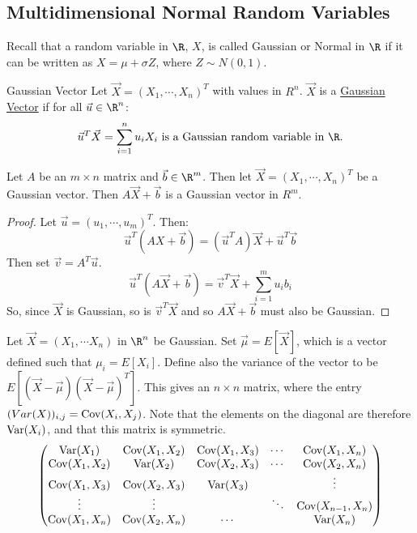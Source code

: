 \documentclass[../Main.tex]{subfiles}
\begin{document}
\subsection{Multidimensional Normal Random Variables}
Recall that a random variable in $\R$, $X$, is called Gaussian or Normal in $\R$ if it can be written as $X = \mu + \sigma Z$, where $Z \sim N(0, 1)$.
\begin{definition}{Gaussian Vector}
    Let $\vec{X} = (X_1, \cdots, X_n)^T$ with values in $R^n$. $\vec{X}$ is a \underline{Gaussian Vector} if for all $\vec{u} \in \R^n$:
    \begin{equation*}
        \vec{u}^T \vec{X} = \sum_{i=1}^n u_i X_i \text{ is a Gaussian random variable in } \R.
    \end{equation*}
\end{definition}
\begin{proposition}
    Let $A$ be an $m \times n$ matrix and $\vec{b} \in \R^m$. Then let $\vec{X} = (X_1, \cdots, X_n)^T$ be a Gaussian vector. Then $A\vec{X} + \vec{b}$ is a Gaussian vector in $R^m$.
    \label{propGaussVecLinearMap}
\end{proposition}
\begin{proof}
    Let $\vec{u} = (u_1, \cdots, u_m)^T$. Then:
    \begin{equation*}
        \vec{u}^T (AX + \vec{b}) = (\vec{u}^T A)\vec{X} + \vec{u}^T \vec{b}
    \end{equation*}
    Then set $\vec{v} = A^T \vec{u}$.
    \begin{equation*}
        \vec{u}^T(A\vec{X} + \vec{b}) = \vec{v}^T \vec{X} + \sum_{i = 1}^m u_i b_i
    \end{equation*}
    So, since $\vec{X}$ is Gaussian, so is $\vec{v}^T \vec{X}$ and so $A\vec{X} + \vec{b}$ must also be Gaussian.
\end{proof}
Let $\vec{X} = (X_1, \cdots X_n)$ in $\R^n$ be Gaussian. Set $\vec{\mu} = E[\vec{X}]$, which is a vector defined such that $\mu_i = E[X_i]$. Define also the variance of the vector to be $E[(\vec{X} - \vec{\mu})(\vec{X} - \vec{\mu})^T]$. This gives an $n \times n$ matrix, where the entry $(Var(X))_{i, j} = \operatorname{Cov}(X_i, X_j)$. Note that the elements on the diagonal are therefore $\operatorname{Var}(X_i)$, and that this matrix is symmetric.
\begin{equation*}
    \begin{pmatrix}
        \operatorname{Var}(X_1) & \operatorname{Cov}(X_1, X_2) & \operatorname{Cov}(X_1, X_3) & \cdots & \operatorname{Cov}(X_1, X_n) \\
        \operatorname{Cov}(X_1, X_2) & \operatorname{Var}(X_2) & \operatorname{Cov}(X_2, X_3) & \cdots & \operatorname{Cov}(X_2, X_n) \\
        \operatorname{Cov}(X_1, X_3) & \operatorname{Cov}(X_2, X_3) & \operatorname{Var}(X_3) & & \vdots \\
        \vdots & \vdots & & \ddots & \operatorname{Cov}(X_{n-1}, X_n) \\
        \operatorname{Cov}(X_1, X_n) & \operatorname{Cov}(X_2, X_n) & \cdots & & \operatorname{Var}(X_n) \\
    \end{pmatrix}
\end{equation*}
\end{document}
